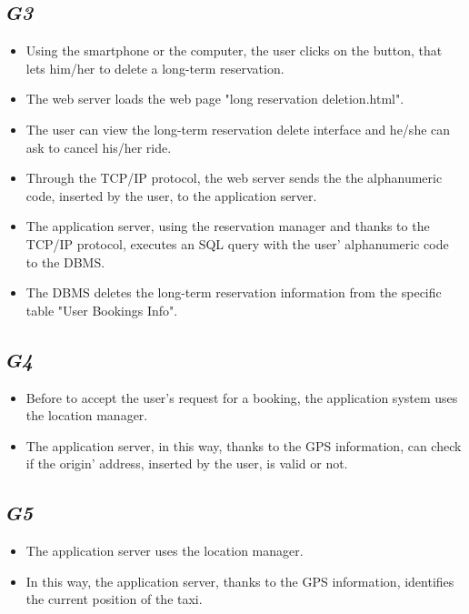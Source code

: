 	\subsection {\emph{G3}}
		\begin{itemize}
			\item Using the smartphone or the computer, the user clicks on the button, that lets him/her to delete a long-term reservation.
			\item The web server loads the web page "long reservation deletion.html".
			\item The user can view the long-term reservation delete interface and he/she can ask to cancel his/her ride.
			\item Through the TCP/IP protocol, the web server sends the the alphanumeric code, inserted by the user, to the application server.
			\item The application server, using the reservation manager and thanks to the TCP/IP protocol, executes an SQL query with the user' alphanumeric code to the DBMS.
			\item The DBMS deletes the long-term reservation information from the specific table "User Bookings Info".
		\end{itemize}
	\subsection {\emph{G4}}
		\begin{itemize}
			\item Before to accept the user's request for a booking, the application system uses the location manager.
			\item The application server, in this way, thanks to the GPS information, can check if the origin' address, inserted by the user, is valid or not.
		\end{itemize}
	\subsection {\emph{G5}}
		\begin{itemize}
			\item The application server uses the location manager.
			\item In this way, the application server, thanks to the GPS information, identifies the current position of the taxi.
		\end{itemize}
